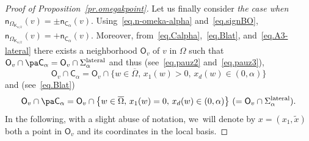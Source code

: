 \begin{proof}[Proof of Proposition~\ref{pr.omegakpoint}]
Let us finally consider \emph{the case when $\mathsf n_{\Omega_{\mathsf K_{\alpha/2}}}(v)=\pm \mathsf n_{\mathsf C_\alpha}(v)$}. Using~\eqref{eq.n-omeka-alpha} and~\eqref{eq.signBO},
$\mathsf n_{\Omega_{\mathsf K_{\alpha/2}}}(v)= +\mathsf n_{\mathsf C_\alpha}(v)$. Moreover, from~\eqref{eq.Calpha},~\eqref{eq.Blat}, and~\eqref{eq.A3-lateral} there exists a neighborhood $\mathsf O_v$ of $v$ in $\Omega$ such that $ \mathsf O_v\cap \pa \mathsf C_\alpha= \mathsf O_v\cap \Sigma_\alpha^{\textup{lateral}}$ and thus (see~\eqref{eq.pauz2} and~\eqref{eq.pauz3}),
\[
\mathsf O_v\cap \mathsf C_\alpha=\mathsf O_v\cap\big \{w\in \overline \Omega, \, x_1(w)>0, \, x_d(w)\in (0,\alpha)\big \}
\]
and (see~\eqref{eq.Blat})
\begin{equation}\label{eq.normalCalpha}
\mathsf O_v\cap \pa \mathsf C_\alpha=\mathsf O_v\cap\big \{w\in \overline \Omega, \, x_1(w)=0, \, x_d(w)\in (0,\alpha)\big \}\ (=\mathsf O_v\cap \Sigma_\alpha^{\textup{lateral}}).
\end{equation}
In the following, with a slight abuse of notation, we~will denote by $x=(x_1,\tilde x)$ both a point in $\mathsf O_v$ and its coordinates in the local basis.


\end{proof}
